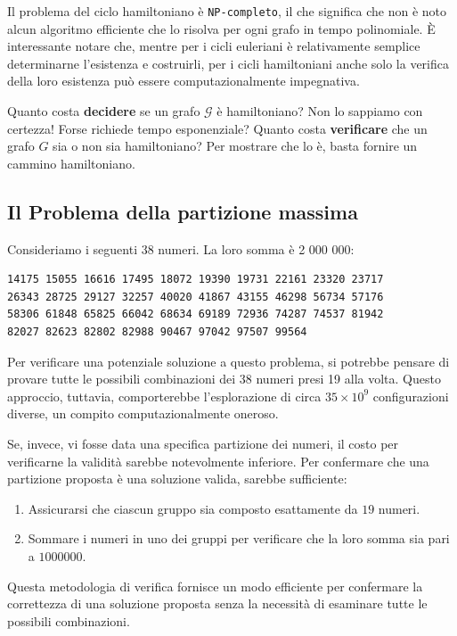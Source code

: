 Il problema del ciclo hamiltoniano è \texttt{NP-completo}, il che significa che non è noto
alcun algoritmo efficiente che lo risolva per ogni grafo in tempo polinomiale.
È interessante notare che, mentre per i cicli euleriani è relativamente semplice
determinarne l'esistenza e costruirli, per i cicli hamiltoniani anche solo la verifica
della loro esistenza può essere computazionalmente impegnativa.

Quanto costa \textbf{decidere} se un grafo $\mathcal{G}$ è hamiltoniano? Non lo sappiamo
con certezza! Forse richiede tempo esponenziale? Quanto costa \textbf{verificare}
che un grafo $G$ sia o non sia hamiltoniano? Per mostrare che lo è, basta fornire un
cammino hamiltoniano.

\subsection{Il Problema della partizione massima}

Consideriamo i seguenti 38 numeri. La loro somma è 2 000 000: 

\begin{verbatim}
14175 15055 16616 17495 18072 19390 19731 22161 23320 23717 
26343 28725 29127 32257 40020 41867 43155 46298 56734 57176 
58306 61848 65825 66042 68634 69189 72936 74287 74537 81942 
82027 82623 82802 82988 90467 97042 97507 99564
\end{verbatim}

Per verificare una potenziale soluzione a questo problema, si potrebbe pensare di provare
tutte le possibili combinazioni dei 38 numeri presi 19 alla volta. Questo approccio,
tuttavia, comporterebbe l'esplorazione di circa $35 \times 10^9$ configurazioni diverse,
un compito computazionalmente oneroso.

Se, invece, vi fosse data una specifica partizione dei numeri, il costo per verificarne
la validità sarebbe notevolmente inferiore. Per confermare che una partizione proposta è una soluzione valida, sarebbe sufficiente:

\begin{enumerate}
    \item Assicurarsi che ciascun gruppo sia composto esattamente da $19$ numeri.
    \item Sommare i numeri in uno dei gruppi per verificare che la loro somma sia
    pari a $1000000$.
\end{enumerate}

Questa metodologia di verifica fornisce un modo efficiente per confermare la correttezza
di una soluzione proposta senza la necessità di esaminare tutte le possibili combinazioni.

